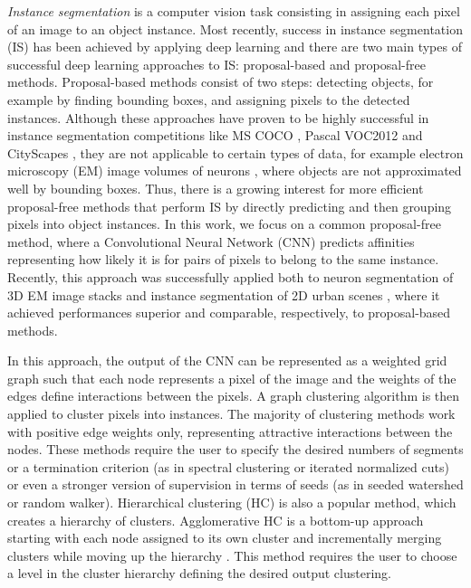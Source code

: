 \emph{Instance segmentation} is a computer vision task consisting in assigning each pixel of an image to an object instance. %
Most recently, success in instance segmentation (IS) has been achieved by applying deep learning and there are two main types of successful deep learning approaches to IS: proposal-based \cite{he2017mask,dai2016instance,li2017fully} and proposal-free \cite{kong2018recurrent,novotny2018semi,kulikov2018instance,kirillov2017instancecut} methods. Proposal-based methods consist of two steps: detecting objects, for example by finding bounding boxes, and assigning pixels to the detected instances. Although these approaches have proven to be highly successful in instance segmentation competitions like MS COCO \cite{lin2014microsoft}, Pascal VOC2012 \cite{everingham2010pascal} and CityScapes \cite{cordts2016cityscapes}, they are not applicable to certain types of data, for example electron microscopy (EM) image volumes of neurons \cite{arganda2015crowdsourcing}, where objects are not approximated well by bounding boxes. 
Thus, there is a growing interest for more efficient proposal-free methods that perform IS by directly predicting  and then grouping pixels into object instances. In this work, we focus on a common proposal-free method, where a Convolutional Neural Network (CNN) predicts affinities representing how likely it is for pairs of pixels to belong to the same instance. Recently, this approach was successfully applied both to neuron segmentation of 3D EM image stacks \cite{lee2017superhuman,wolf2018mutex} and instance segmentation of 2D urban scenes \cite{liu2018affinity}, where it achieved performances superior and comparable, respectively, to proposal-based methods.

In this approach, the output of the CNN can be represented as a weighted grid graph such that each node represents a pixel of the image and the weights of the edges define interactions between the pixels. A graph clustering algorithm is then applied to cluster pixels into instances. The majority of clustering methods work with positive edge weights only, representing attractive interactions between the nodes. These methods require the user to specify the desired numbers of segments or a termination criterion (as in spectral clustering or iterated normalized cuts) or even a stronger version of supervision in terms of seeds (as in seeded watershed or random walker).  
Hierarchical clustering (HC) is also a popular method, which creates a hierarchy of clusters. Agglomerative HC is a bottom-up approach starting with each node assigned to its own cluster and incrementally merging clusters while moving up the hierarchy \cite{lance1967general}. This method requires the user to choose a level in the cluster hierarchy defining the desired output clustering. 

